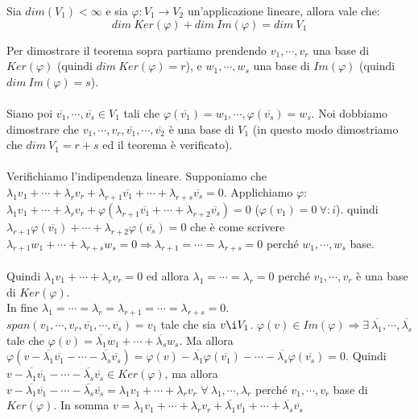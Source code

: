 \begin{theorem}
Sia $dim(V_1) < \infty$ e sia $\varphi: V_1 \to V_2$ un'applicazione lineare, allora vale che:
\[dim\: Ker(\varphi) + dim \: Im(\varphi) = dim \: V_1\]
\end{theorem}

\begin{demostration}
Per dimostrare il teorema sopra partiamo prendendo $v_1, \cdots, v_r$ una base di $Ker(\varphi)$ (quindi $dim\:Ker(\varphi) = r$), e $w_1, \cdots, w_s$ una base di $Im(\varphi)$ (quindi $dim\:Im(\varphi) = s$). \\\\
Siano poi $\overline{v_1}, \cdots, \overline{v_s} \in V_1$ tali che $\varphi(\overline{v_1}) = w_1, \cdots, \varphi(\overline{v_s}) = w_s$. Noi dobbiamo dimostrare che $v_1, \cdots, v_r, \overline{v_1}, \cdots, \overline{v_2}$ è una base di $V_1$ (in questo modo dimostriamo che $dim\:V_1 = r + s$ ed il teorema è verificato).\\\\
Verifichiamo l'indipendenza lineare. Supponiamo che $\lambda_1 v_1 + \cdots + \lambda_r v_r + \lambda_{r+1}\overline{v_1} + \cdots + \lambda_{r+s}\overline{v_s} = 0$. Applichiamo $\varphi$: $\lambda_1 v_1 + \cdots + \lambda_r v_r + \varphi(\lambda_{r+1}\overline{v_1} + \cdots + \lambda_{r+2}\overline{v_s}) = 0$ ($\varphi(v_1) = 0 \:\forall : i$). quindi $\lambda_{r+1}\varphi(\overline{v_1}) + \cdots + \lambda_{r+2}\varphi(\overline{v_s}) = 0$ che è come scrivere $\lambda_{r+1}w_1 + \cdots + \lambda_{r+s}w_s = 0 \Longrightarrow \lambda_{r+1} = \cdots = \lambda_{r+s} = 0$ perché $w_1, \cdots, w_s$ base.\\\\
Quindi $\lambda_1 v_1 + \cdots + \lambda_r v_r = 0$ ed allora $\lambda_1 = \cdots = \lambda_r = 0$ perché $v_1, \cdots, v_r$ è una base di $Ker(\varphi)$.\\
In fine $\lambda_1 = \cdots = \lambda_r = \lambda_{r+1} = \cdots = \lambda_{r+s} = 0$.\\
$span(v_1, \cdots, v_r, \overline{v_1}, \cdots, \overline{v_s}) = v_1$ tale che sia $v \i V_1$. $\varphi(v) \in Im(\varphi) \Longrightarrow \exists \: \overline{\lambda_1}, \cdots, \overline{\lambda_s}$ tale che $\varphi(v) = \overline{\lambda_1}w_1 + \cdots + \overline{\lambda_s}w_s$. Ma allora $\varphi(v - \overline{\lambda_1}\overline{v_1} - \cdots - \overline{\lambda_s}\overline{v_s}) = \varphi(v) - \overline{\lambda_1}\varphi(\overline{v_1}) - \cdots - \overline{\lambda_s}\varphi(\overline{v_s}) = 0$. Quindi $v - \overline{\lambda_1}\overline{v_1} - \cdots - \overline{\lambda_s}\overline{v_s} \in Ker(\varphi)$, ma allora $v - \overline{\lambda_1}\overline{v_1} - \cdots - \overline{\lambda_s}\overline{v_s} = \lambda_1 v_1 + \cdots + \lambda_r v_r$ $\forall \: \lambda_{1}, \cdots, \lambda_r$ perché $v_1, \cdots, v_r$ base di $Ker(\varphi)$. In somma $v = \lambda_1 v_1 + \cdots + \lambda_r v_r + \overline{\lambda_1}\overline{v_1} + \cdots + \overline{\lambda_s}\overline{v_s}$
\end{demostration}

